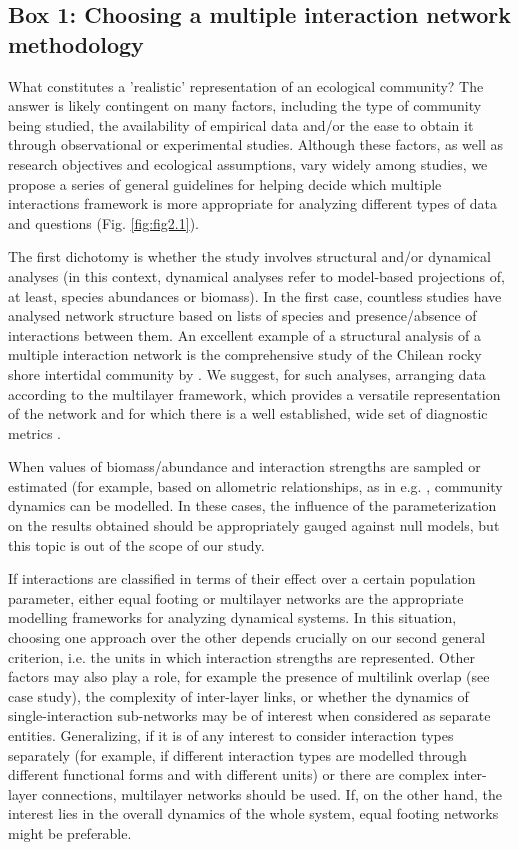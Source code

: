 \begin{small}
\begin{mdframed}
\subsection*{Box 1: Choosing a multiple interaction network methodology}
What constitutes a {}'realistic{}' representation of an ecological community? The answer is likely contingent on many factors, including the type of community being studied, the availability of empirical data and/or the ease to obtain it through observational or experimental studies. Although these factors, as well as research objectives and ecological assumptions, vary widely among studies, we propose a series of general guidelines for helping decide which multiple interactions framework is more appropriate for analyzing different types of data and questions (Fig. \ref{fig:fig2.1}).

The first dichotomy is whether the study involves structural and/or dynamical analyses (in this context, dynamical analyses refer to model-based projections of, at least, species abundances or biomass). In the first case, countless studies have analysed network structure based on lists of species and presence/absence of interactions between them. An excellent example of a structural analysis of a multiple interaction network is the comprehensive study of the Chilean rocky shore intertidal community by \cite{Kefi2015}. We suggest, for such analyses, arranging data according to the multilayer framework, which provides a versatile representation of the network and for which there is a well established, wide set of diagnostic metrics \citep{Pilosof2017}.

When values of biomass/abundance and interaction strengths are sampled or estimated (for example, based on allometric relationships, as in e.g. \cite{Kefi2016a}, community dynamics can be modelled. In these cases, the influence of the parameterization on the results obtained should be appropriately gauged against null models, but this topic is out of the scope of our study.

If interactions are classified in terms of their effect over a certain population parameter, either equal footing or multilayer networks are the appropriate modelling frameworks for analyzing dynamical systems. In this situation, choosing one approach over the other depends crucially on our second general criterion, i.e. the units in which interaction strengths are represented. Other factors may also play a role, for example the presence of multilink overlap (see case study), the complexity of inter-layer links, or whether the dynamics of single-interaction sub-networks may be of interest when considered as separate entities. Generalizing, if it is of any interest to consider interaction types separately (for example, if different interaction types are modelled through different functional forms and with different units) or there are complex inter-layer connections, multilayer networks should be used. If, on the other hand, the interest lies in the overall dynamics of the whole system, equal footing networks might be preferable.


\end{mdframed}
\end{small}
